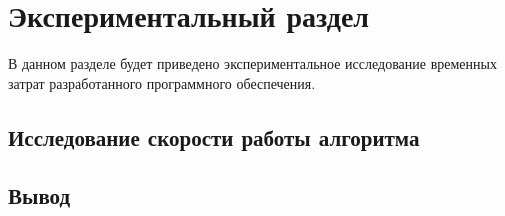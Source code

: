 \chapter{Экспериментальный раздел}
	
\vspace{-0.5cm}\hspace{0.6cm}В данном разделе будет приведено экспериментальное исследование временных затрат разработанного программного обеспечения.


\section{Исследование скорости работы алгоритма}


\section{Вывод}

